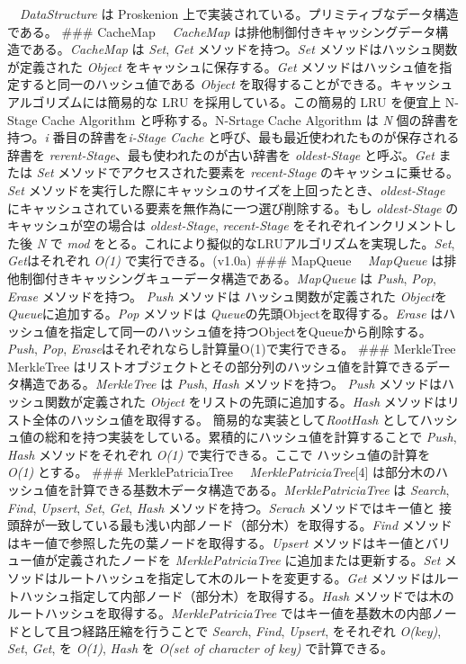 　\emph{DataStructure} は Proskenion
上で実装されている。プリミティブなデータ構造である。 \#\#\# CacheMap
　\emph{CacheMap}
は排他制御付きキャッシングデータ構造である。\emph{CacheMap} は
\emph{Set}, \emph{Get} メソッドを持つ。\emph{Set}
メソッドはハッシュ関数が定義された \emph{Object}
をキャッシュに保存する。\emph{Get}
メソッドはハッシュ値を指定すると同一のハッシュ値である \emph{Object}
を取得することができる。キャッシュアルゴリズムには簡易的な LRU
を採用している。この簡易的 LRU を便宜上 N-Stage Cache Algorithm
と呼称する。N-Srtage Cache Algorithm は \emph{N}
個の辞書を持つ。\emph{i} 番目の辞書を\emph{i-Stage Cache}
と呼び、最も最近使われたものが保存される辞書を
\emph{rerent-Stage}、最も使われたのが古い辞書を \emph{oldest-Stage}
と呼ぶ。\emph{Get} または \emph{Set} メソッドでアクセスされた要素を
\emph{recent-Stage} のキャッシュに乗せる。\emph{Set}
メソッドを実行した際にキャッシュのサイズを上回ったとき、\emph{oldest-Stage}
にキャッシュされている要素を無作為に一つ選び削除する。もし
\emph{oldest-Stage} のキャッシュが空の場合は \emph{oldest-Stage},
\emph{recent-Stage} をそれぞれインクリメントした後 \emph{N} で
\emph{mod}
をとる。これにより擬似的なLRUアルゴリズムを実現した。\emph{Set},
\emph{Get}はそれぞれ \emph{O(1)} で実行できる。(v1.0a) \#\#\# MapQueue
　\emph{MapQueue}
は排他制御付きキャッシングキューデータ構造である。\emph{MapQueue} は
\emph{Push}, \emph{Pop}, \emph{Erase} メソッドを持つ。 \emph{Push}
メソッドは ハッシュ関数が定義された \emph{Object}を
\emph{Queue}に追加する。\emph{Pop} メソッドは
\emph{Queue}の先頭Objectを取得する。\emph{Erase}
はハッシュ値を指定して同一のハッシュ値を持つObjectをQueueから削除する。\emph{Push},
\emph{Pop}, \emph{Erase}はそれぞれならし計算量O(1)で実行できる。 \#\#\#
MerkleTree MerkleTree
はリストオブジェクトとその部分列のハッシュ値を計算できるデータ構造である。\emph{MerkleTree}
は \emph{Push}, \emph{Hash} メソッドを持つ。 \emph{Push}
メソッドはハッシュ関数が定義された \emph{Object}
をリストの先頭に追加する。\emph{Hash}
メソッドはリスト全体のハッシュ値を取得する。
簡易的な実装として\emph{RootHash}
としてハッシュ値の総和を持つ実装をしている。累積的にハッシュ値を計算することで
\emph{Push}, \emph{Hash} メソッドをそれぞれ \emph{O(1)}
で実行できる。ここで ハッシュ値の計算を \emph{O(1)} とする。 \#\#\#
MerklePatriciaTree 　\emph{MerklePatriciaTree}{[}4{]}
は部分木のハッシュ値を計算できる基数木データ構造である。\emph{MerklePatriciaTree}
は \emph{Search}, \emph{Find}, \emph{Upsert}, \emph{Set}, \emph{Get},
\emph{Hash} メソッドを持つ。\emph{Serach} メソッドではキー値と
接頭辞が一致している最も浅い内部ノード（部分木）を取得する。\emph{Find}
メソッドはキー値で参照した先の葉ノードを取得する。\emph{Upsert}
メソッドはキー値とバリュー値が定義されたノードを
\emph{MerklePatriciaTree} に追加または更新する。\emph{Set}
メソッドはルートハッシュを指定して木のルートを変更する。\emph{Get}
メソッドはルートハッシュ指定して内部ノード（部分木）を取得する。\emph{Hash}
メソッドでは木のルートハッシュを取得する。\emph{MerklePatriciaTree}
ではキー値を基数木の内部ノードとして且つ経路圧縮を行うことで
\emph{Search}, \emph{Find}, \emph{Upsert}, をそれぞれ
\emph{O(\textbar key\textbar)}, \emph{Set}, \emph{Get}, を \emph{O(1)},
\emph{Hash} を \emph{O(\textbar set of character of key\textbar)}
で計算できる。


